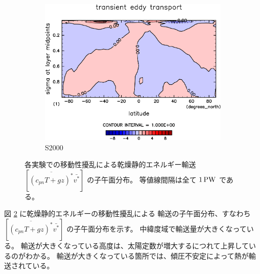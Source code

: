 \documentclass[body]{subfiles}
\begin{document}
\begin{figure}[t]
\begin{subfigure}{.4\textwidth}
		\centering
		\includegraphics[width=\columnwidth]{S2000/MeriHeatTransTest@dryStatEn_TE,time=7300:7665-crop-rotate.pdf}
		\caption{S2000}\label{乾燥静的エネルギー移動性擾乱S2000}
	\end{subfigure}
	\caption[各実験での移動性擾乱に依る乾燥静的エネルギー輸送の子午面分布]{
		各実験での移動性擾乱による乾燥静的エネルギー輸送 \([\overline{(c_{pn}T+gz)^*}\bar{v^*}]\) の子午面分布。
		等値線間隔は全て \(1\hmu{PW}\) である。
	}\label{乾燥静的エネルギー移動性擾乱}
\end{figure}

図 \ref{乾燥静的エネルギー移動性擾乱} に乾燥静的エネルギーの移動性擾乱による
輸送の子午面分布、すなわち \([\overline{(c_{pn}T+gz)^*}\bar{v^*}]\) の子午面分布を示す。
中緯度域で輸送量が大きくなっている。
輸送が大きくなっている高度は、太陽定数が増大するにつれて上昇しているのがわかる。
輸送が大きくなっている箇所では、傾圧不安定によって熱が輸送されている。
\end{document}

